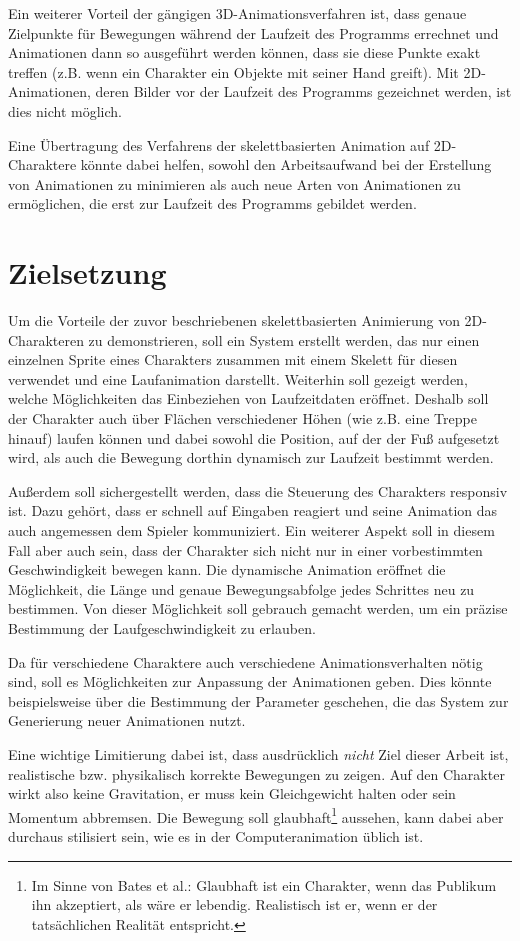 Ein weiterer Vorteil der gängigen 3D-Animationsverfahren ist, dass genaue Zielpunkte für Bewegungen während der Laufzeit des Programms errechnet und Animationen dann so ausgeführt werden können, dass sie diese Punkte exakt treffen (z.B. wenn ein Charakter ein Objekte mit seiner Hand greift). Mit 2D-Animationen, deren Bilder vor der Laufzeit des Programms gezeichnet werden, ist dies nicht möglich.

Eine Übertragung des Verfahrens der skelettbasierten Animation auf 2D-Charaktere könnte dabei helfen, sowohl den Arbeitsaufwand bei der Erstellung von Animationen zu minimieren als auch neue Arten von Animationen zu ermöglichen, die erst zur Laufzeit des Programms gebildet werden.

\section{Zielsetzung}
Um die Vorteile der zuvor beschriebenen skelettbasierten Animierung von 2D-Charakteren zu demonstrieren, soll ein System erstellt werden, das nur einen einzelnen Sprite eines Charakters zusammen mit einem Skelett für diesen verwendet und eine Laufanimation darstellt. Weiterhin soll gezeigt werden, welche Möglichkeiten das Einbeziehen von Laufzeitdaten eröffnet. Deshalb soll der Charakter auch über Flächen verschiedener Höhen (wie z.B. eine Treppe hinauf) laufen können und dabei sowohl die Position, auf der der Fuß aufgesetzt wird, als auch die Bewegung dorthin dynamisch zur Laufzeit bestimmt werden.

Außerdem soll sichergestellt werden, dass die Steuerung des Charakters responsiv ist. Dazu gehört, dass er schnell auf Eingaben reagiert und seine Animation das auch angemessen dem Spieler kommuniziert. Ein weiterer Aspekt soll in diesem Fall aber auch sein, dass der Charakter sich nicht nur in einer vorbestimmten Geschwindigkeit bewegen kann. Die dynamische Animation eröffnet die Möglichkeit, die Länge und genaue Bewegungsabfolge jedes Schrittes neu zu bestimmen. Von dieser Möglichkeit soll gebrauch gemacht werden, um ein präzise Bestimmung der Laufgeschwindigkeit zu erlauben.

Da für verschiedene Charaktere auch verschiedene Animationsverhalten nötig sind, soll es Möglichkeiten zur Anpassung der Animationen geben. Dies könnte beispielsweise über die Bestimmung der Parameter geschehen, die das System zur Generierung neuer Animationen nutzt.

Eine wichtige Limitierung dabei ist, dass ausdrücklich \textit{nicht} Ziel dieser Arbeit ist, realistische bzw. physikalisch korrekte Bewegungen zu zeigen. Auf den Charakter wirkt also keine Gravitation, er muss kein Gleichgewicht halten oder sein Momentum abbremsen. Die Bewegung soll glaubhaft\footnote{Im Sinne von Bates et al.\cite{bates1994role}: Glaubhaft ist ein Charakter, wenn das Publikum ihn akzeptiert, als wäre er lebendig. Realistisch ist er, wenn er der tatsächlichen Realität entspricht.} aussehen, kann dabei aber durchaus stilisiert sein, wie es in der Computeranimation üblich ist.

